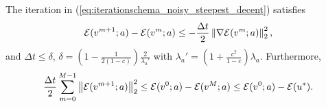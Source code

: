 \begin{lemma}
	\label{lemma1}
	The iteration in (\ref{eq:iterationschema_noisy_steepest_decent}) satisfies
	\begin{equation}
		\mathcal{E}(v^{m+1};a) - \mathcal{E}(v^m;a) \leq - \frac{\Delta t}{2} \left\lVert\nabla \mathcal{E}(v^m;a)\right\rVert_{2}^{2},
	\end{equation}
	and $\Delta t \leq \delta$, $\delta = (1-\frac{1}{2(1-c)}) \frac{2}{\lambda_{a}'}$ with $\lambda_{a}' = (1+ \frac{c^2}{1-c}) \lambda_{a}$. Furthermore, 
	\begin{equation}
		\label{eq:toproof_in_lemma1}
		\frac{\Delta t}{2} \sum_{m = 0}^{M-1} \left\lVert\mathcal{E}(v^{m+1};a)\right\rVert_{2}^{2} \leq \mathcal{E}(v^0;a) - \mathcal{E}(v^M;a) \leq \mathcal{E}(v^0;a) - \mathcal{E}(u^*).
	\end{equation}
\end{lemma}
